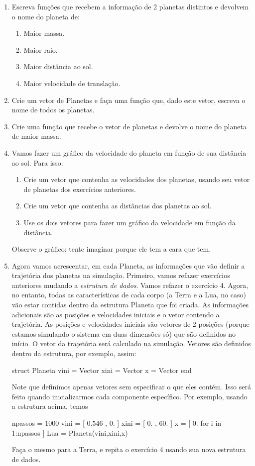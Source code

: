 \documentclass[10pt,a4paper,ssfamily]{exam}
\begin{document}
\begin{enumerate}
\item
Escreva funções que recebem a informação de 2 planetas distintos e
devolvem o nome do planeta de:
\begin{enumerate}
\item
Maior massa.
\item
Maior raio.
\item
Maior distância ao sol.
\item
Maior velocidade de translação.
\end{enumerate}

\item
Crie um vetor de Planetas e faça uma função que, dado este vetor,
escreva o nome de todos os planetas.

\item
Crie uma função que recebe o vetor de planetas e devolve o nome do
planeta de maior massa.

\item
Vamos fazer um gráfico da velocidade do planeta em função de sua
distância ao sol. Para isso:
\begin{enumerate}
\item
Crie um vetor que contenha as velocidades dos planetas, usando seu vetor
de planetas dos exercícios anteriores.
\item
Crie um vetor que contenha as distâncias dos planetas ao sol.
\item
Use os dois vetores para fazer um gráfico da velocidade em função da
distância.
\end{enumerate}
Observe o gráfico: tente imaginar porque ele tem a cara que tem.

\item
Agora vamos acrescentar, em cada Planeta, as informações que vão definir
a trajetória dos planetas na simulação. Primeiro, vamos refazer
exercícios anteriores mudando a {\it estrutura de dados}. Vamos refazer
o exercício 4. Agora, no entanto, todas as características de cada corpo
(a Terra e a Lua, no caso) vão estar contidas dentro da estrutura
Planeta que foi criada. As informações adicionais são as posições e
velocidades iniciais e o vetor contendo a trajetória. As posições e
velocidades iniciais são vetores de 2 posições (porque estamos simulando
o sistema em duas dimensões só) que são definidos no início. O vetor da
trajetória será calculado na simulação. Vetores são definidos dentro da
estrutura, por exemplo, assim:
\begin{code}
struct Planeta
  vini = Vector{}
  xini = Vector{}
  x = Vector{}
end
\end{code}
Note que definimos apenas vetores sem especificar o que eles contém.
Isso será feito quando inicializarmos cada componente específico. Por
exemplo, usando a estrutura acima, temos 
\begin{code}
npassos = 1000
vini = [ 0.546 , 0. ]
xini = [ 0. , 60. ]
x = [ 0. for i in 1:npassos ]
Lua = Planeta(vini,xini,x)
\end{code}
Faça o mesmo para a Terra, e repita o exercício 4 usando sua nova
estrutura de dados.

\end{enumerate}
\end{document}

